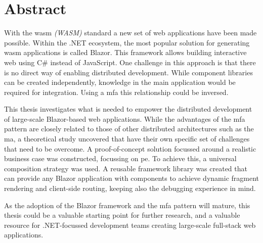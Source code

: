 
\chapter*{Abstract}
\label{ch:abstract}


With the \gls{wasm} \textit{(WASM)} standard a new set of web applications have
been made possible. Within the .NET ecosystem, the most popular solution for
generating \gls{wasm} applications is called Blazor. This framework allows
building interactive web  using C\# instead of JavaScript. One
challenge in this approach is that there is no direct way of enabling
distributed development. While component libraries can be created independently,
knowledge in the main application would be required for integration. Using a
\gls{mfa} this relationship could be inversed. 

This thesis investigates what is needed to empower the distributed development
of large-scale Blazor-based web applications. While the advantages of the
\gls{mfa} pattern are closely related to those of other distributed
architectures such as the \gls{ma}, a theoretical study uncovered that
 have their own specific set of challenges that need to
be overcome. A proof-of-concept solution focussed around a realistic business
case was constructed, focussing on \gls{pe}. To achieve this, a universal
composition strategy was used. A reusable framework library was created that can
provide any Blazor application with components to achieve dynamic fragment
rendering and client-side routing, keeping also the debugging experience in
mind.

As the adoption of the Blazor framework and the \gls{mfa} pattern will mature,
this thesis could be a valuable starting point for further research, and a
valuable resource for .NET-focussed development teams
creating large-scale full-stack web applications. 